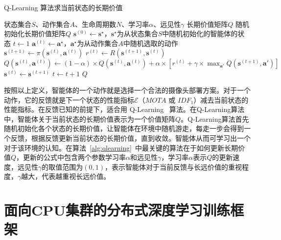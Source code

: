 \begin{algorithm}[!htb]
    \caption{Q-Learning 算法求当前状态的长期价值}
    \label{alg:qlearning}
    \begin{algorithmic}[1]
        \Require 状态集合$S$、动作集合$A$、生命周期数$N$、学习率$\alpha$、远见性$\gamma$
        \Ensure 长期价值矩阵$Q$
            \State 随机初始化长期价值矩阵$Q$
                \State $\boldsymbol{s}^{(0)}\gets\boldsymbol{s}^\star$，$\boldsymbol{s}^\star$为从状态集合$S$中随机初始化的智能体的状态
                \State $t\gets1$
                \Repeat
                    \State $\boldsymbol{a}^{(t)}\gets \boldsymbol{a}^\star$，$\boldsymbol{a}^\star$为从动作集合$A$中随机选取的动作
                    \State $\boldsymbol{s}^{(t+1)}\gets \pi\left(\boldsymbol{s}^{(t)}, \boldsymbol{a}^{(t)}\right)$
                    \State $r^{(t)}\gets R\left(\boldsymbol{s}^{(t+1)},\boldsymbol{s}^{(t)}\right)$
                    \State $Q\left(\boldsymbol{s}^{(t)},\boldsymbol{a}^{(t)}\right)\gets(1-\alpha)\times Q\left(\boldsymbol{s}^{(t)},\boldsymbol{a}^{(t)}\right)+\alpha\times\left[r^{(t)}+\gamma\times\max_{\boldsymbol{a}'}Q\left(\boldsymbol{s}^{(t+1)}, \boldsymbol{a}'\right)\right]$
                    \State $\boldsymbol{s}^{(t)}\gets\boldsymbol{s}^{(t+1)}$
                    \State $t\gets  t+1$
            \EndFor
            \State\Return $Q$
        \EndFunction
    \end{algorithmic}
\end{algorithm}

按照以上定义，智能体的一个动作就是选择一个合法的摄像头部署方案。对于一个动作，它的反馈就是下一个状态的性能指标$\mathcal{E}$（$\mathit{MOTA}$ 或 $\mathit{IDF_1}$）减去当前状态的性能指标。在反馈已知的前提下，适合用 Q-Learning~\cite{watkins1989learning} 算法。在Q-Learning算法中，智能体关于当前状态的长期价值表示为一个价值矩阵$Q$。Q-Learning算法首先随机初始化各个状态的长期价值，让智能体在环境中随机游走，每走一步会得到一个反馈，根据反馈更新当前状态的长期价值，直到收敛。智能体从而可学习出一个对于该环境的认知。在算法~\ref{alg:qlearning}~中最关键的算法在于如何更新长期价值$Q$，更新的公式中包含两个参数学习率$\alpha$和远见性$\gamma$，学习率$\alpha$表示$Q$的更新速度，远见性$\gamma$的取值范围为$(0, 1)$，表示智能体对于当前反馈与长远价值的重视程度，$\gamma$越大，代表越重视长远价值。

\section{面向CPU集群的分布式深度学习训练框架}

